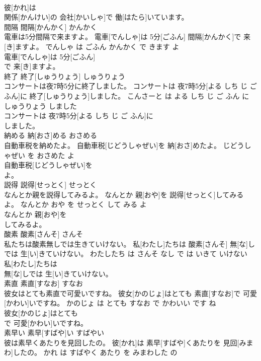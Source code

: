 \documentclass[8pt]{extreport}
\begin{document}
\begin{CJK}{UTF8}{min}
\\	彼[かれ]は
\\	関係[かんけい]の 会社[かいしゃ]で 働[はたら]いています。			
\\	間隔	間隔[かんかく]	かんかく	
\\	電車は5分間隔で来ますよ。	電車[でんしゃ]は 5分[ごふん] 間隔[かんかく]で 来[き]ますよ。	でんしゃ は ごふん かんかく で きます よ	
\\	電車[でんしゃ]は 5分[ごふん]
\\	で 来[き]ますよ。			
\\	終了	終了[しゅうりょう]	しゅうりょう	
\\	コンサートは夜7時5分に終了しました。	コンサートは 夜7時5分[よる しち じ ご ふん]に 終了[しゅうりょう]しました。	こんさーと は よる しち じ ご ふん に しゅうりょう しました	
\\	コンサートは 夜7時5分[よる しち じ ご ふん]に
\\	しました。			
\\	納める	納[おさ]める	おさめる	
\\	自動車税を納めたよ。	自動車税[じどうしゃぜい]を 納[おさ]めたよ。	じどうしゃぜい を おさめた よ	
\\	自動車税[じどうしゃぜい]を
\\	よ。			
\\	説得	説得[せっとく]	せっとく	
\\	なんとか親を説得してみるよ。	なんとか 親[おや]を 説得[せっとく]してみるよ。	なんとか おや を せっとく して みる よ	
\\	なんとか 親[おや]を
\\	してみるよ。			
\\	酸素	酸素[さんそ]	さんそ	
\\	私たちは酸素無しでは生きていけない。	私[わたし]たちは 酸素[さんそ] 無[な]しでは 生[い]きていけない。	わたしたち は さんそ なし で は いきて いけない	
\\	私[わたし]たちは
\\	無[な]しでは 生[い]きていけない。			
\\	素直	素直[すなお]	すなお	
\\	彼女はとても素直で可愛いですね。	彼女[かのじょ]はとても 素直[すなお]で 可愛[かわい]いですね。	かのじょ は とても すなお で かわいい です ね	
\\	彼女[かのじょ]はとても
\\	で 可愛[かわい]いですね。			
\\	素早い	素早[すばや]い	すばやい	
\\	彼は素早くあたりを見回したの。	彼[かれ]は 素早[すばや]くあたりを 見回[みまわ]したの。	かれ は すばやく あたり を みまわした の	

\end{CJK}
\end{document}
